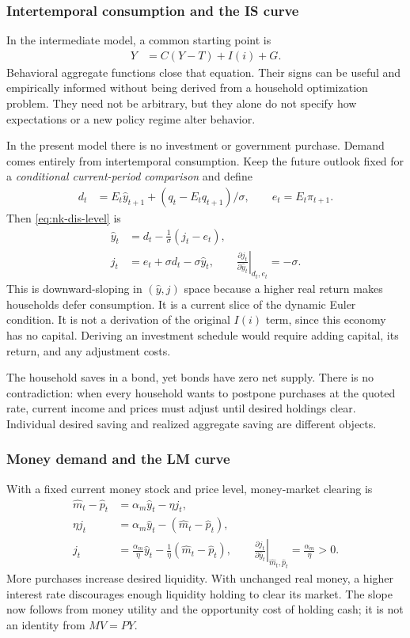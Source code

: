\subsubsection{Intertemporal consumption and the IS curve}

In the intermediate model, a common starting point is
\begin{align}
 Y&=C(Y-T)+I(i)+G.
\end{align}
Behavioral aggregate functions close that equation. Their signs can be useful
and empirically informed without being derived from a household optimization
problem. They need not be arbitrary, but they alone do not specify how
expectations or a new policy regime alter behavior.

In the present model there is no investment or government purchase. Demand
comes entirely from intertemporal consumption. Keep the future outlook fixed
for a \emph{conditional current-period comparison} and define
\begin{align}
 d_t&=E_t\hat y_{t+1}+(q_t-E_tq_{t+1})/\sigma,\qquad
 e_t=E_t\pi_{t+1}.
\end{align}
Then \eqref{eq:nk-dis-level} is
\begin{align}
 \hat y_t&=d_t-\frac1\sigma(j_t-e_t),\\
 j_t&=e_t+\sigma d_t-\sigma\hat y_t,\qquad
 \left.\frac{\partial j_t}{\partial\hat y_t}\right|_{d_t,e_t}=-\sigma.
 \label{eq:nk-static-is}
\end{align}
This is downward-sloping in $(\hat y,j)$ space because a higher real return
makes households defer consumption. It is a current slice of the dynamic
Euler condition. It is not a derivation of the original $I(i)$ term, since
this economy has no capital. Deriving an investment schedule would require
adding capital, its return, and any adjustment costs.

The household saves in a bond, yet bonds have zero net supply. There is no
contradiction: when every household wants to postpone purchases at the quoted
rate, current income and prices must adjust until desired holdings clear.
Individual desired saving and realized aggregate saving are different objects.

\subsubsection{Money demand and the LM curve}

With a fixed current money stock and price level, money-market clearing is
\begin{align}
 \hat m_t-\hat p_t&=\alpha_m\hat y_t-\eta j_t,\\
 \eta j_t&=\alpha_m\hat y_t-(\hat m_t-\hat p_t),\\
 j_t&=\frac{\alpha_m}{\eta}\hat y_t
                 -\frac1\eta(\hat m_t-\hat p_t),\qquad
 \left.\frac{\partial j_t}{\partial\hat y_t}\right|_{\hat m_t,\hat p_t}
       =\frac{\alpha_m}{\eta}>0.\label{eq:nk-static-lm}
\end{align}
More purchases increase desired liquidity. With unchanged real money, a higher
interest rate discourages enough liquidity holding to clear its market.
The slope now follows from money utility and the opportunity cost of holding
cash; it is not an identity from $MV=PY$.

